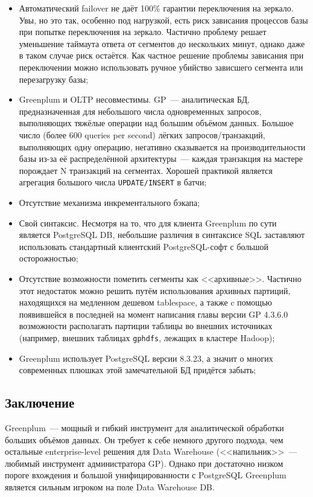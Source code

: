 \begin{itemize}
  \item Автоматический failover не даёт 100\% гарантии переключения на зеркало. Увы, но это так, особенно под нагрузкой, есть риск зависания процессов базы при попытке переключения на зеркало. Частично проблему решает уменьшение таймаута ответа от сегментов до нескольких минут, однако даже в таком случае риск остаётся. Как частное решение проблемы зависания при переключении можно использовать ручное убийство зависшего сегмента или перезагрузку базы;
  \item Greenplum и OLTP несовместимы. GP~--- аналитическая БД, предназначенная для небольшого числа одновременных запросов, выполняющих тяжёлые операции над большим объёмом данных. Большое число (более 600 queries per second) лёгких запросов/транзакций, выполняющих одну операцию, негативно сказывается на производительности базы из-за её распределённой архитектуры~--- каждая транзакция на мастере порождает N транзакций на сегментах. Хорошей практикой является агрегация большого числа \lstinline!UPDATE/INSERT! в батчи;
  \item Отсутствие механизма инкрементального бэкапа;
  \item Свой синтаксис. Несмотря на то, что для клиента Greenplum по сути является PostgreSQL DB, небольшие различия в синтаксисе SQL заставляют использовать стандартный клиентский PostgreSQL-софт с большой осторожностью;
  \item Отсутствие возможности пометить сегменты как <<архивные>>. Частично этот недостаток можно решить путём использования архивных партиций, находящихся на медленном дешевом tablespace, а также c помощью появившейся в последней на момент написания главы версии GP 4.3.6.0 возможности располагать партиции таблицы во внешних источниках (например, внешних таблицах \lstinline!gphdfs!, лежащих в кластере Hadoop);
  \item Greenplum использует PostgreSQL версии 8.3.23, а значит о многих современных плюшках этой замечательной БД придётся забыть;
\end{itemize}


\subsection{Заключение}

Greenplum~--- мощный и гибкий инструмент для аналитической обработки больших объёмов данных. Он требует к себе немного другого подхода, чем остальные enterprise-level решения для Data Warehouse (<<напильник>>~--- любимый инструмент администратора GP). Однако при достаточно низком пороге вхождения и большой унифицированности с PostgreSQL Greenplum является сильным игроком на поле Data Warehouse DB.
